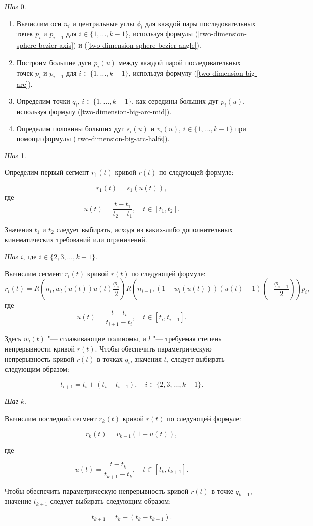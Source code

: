 \bigskip
\textit{Шаг} 0.

\begin{enumerate}
\item Вычислим оси $n_i$ и центральные углы $\phi_i$ для каждой пары последовательных точек $p_i$ и $p_{i+1}$ для
$i \in \{1,\dots,k-1\}$, используя формулы (\ref{two-dimension-sphere-bezier-axis}) и
(\ref{two-dimension-sphere-bezier-angle}).
\item Построим большие дуги $p_i(u)$ между каждой парой последовательных точек $p_i$ и $p_{i+1}$ для
$i \in \{1,\dots,k-1\}$, используя формулу (\ref{two-dimension-big-arc}).
\item Определим точки $q_i$, $i \in \{1,\dots,k-1\}$, как середины больших дуг $p_i(u)$, используя формулу
(\ref{two-dimension-big-arc-mid}).
\item Определим половины больших дуг $s_i(u)$ и $v_i(u)$, $i \in \{1,\dots,k-1\}$ при помощи формулы
(\ref{two-dimension-big-arc-halfs}).
\end{enumerate}

\bigskip
\textit{Шаг} 1.

Определим первый сегмент $r_1(t)$ кривой $r(t)$ по следующей формуле:

$$
r_1(t)=s_1(u(t)),
$$
\noindent где
$$
u(t)=\frac{t-t_1}{t_2-t_1}, \quad t \in [t_1,t_2].
$$

Значения $t_1$ и $t_2$ следует выбирать, исходя из каких-либо дополнительных кинематических требований или ограничений.

\bigskip
\textit{Шаг} $i$, где $i \in \{2,3,\dots,k-1\}$.

Вычислим сегмент $r_i(t)$ кривой $r(t)$ по следующей формуле:
$$
r_i(t)=R(n_i,w_l(u(t))u(t)\frac{\phi_i}{2})R(n_{i-1},(1-w_l(u(t)))(u(t)-1)(-\frac{\phi_{i-1}}{2}))p_i,
$$
\noindent где
$$
u(t)=\frac{t-t_i}{t_{i+1}-t_i}, \quad t \in [t_i,t_{i+1}].
$$

Здесь $w_l(t)$ "--- сглаживающие полиномы, и $l$ "--- требуемая степень непрерывности кривой $r(t)$. Чтобы обеспечить
параметрическую непрерывность кривой $r(t)$ в точках $q_i$, значения $t_i$ следует выбирать следующим образом:

$$
t_{i+1}=t_i+(t_i-t_{i-1}), \quad i \in \{2,3,\dots,k-1\}.
$$

\bigskip
\textit{Шаг} $k$.

Вычислим последний сегмент $r_k(t)$ кривой $r(t)$ по следующей формуле:

$$
r_k(t)=v_{k-1}(1-u(t)),
$$

\noindent где

$$
u(t)=\frac{t-t_k}{t_{k+1}-t_k}, \quad t \in [t_k,t_{k+1}].
$$

Чтобы обеспечить параметрическую непрерывность кривой $r(t)$ в точке $q_{k-1}$, значение $t_{k+1}$ следует выбирать
следующим образом:

$$
t_{k+1}=t_k+(t_k-t_{k-1}).
$$
